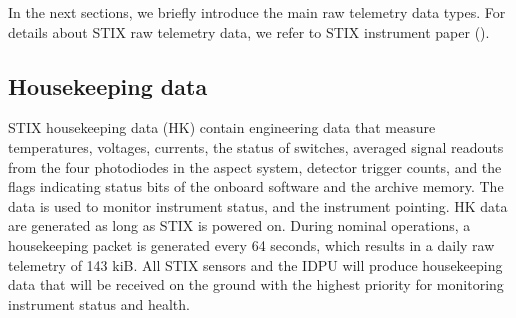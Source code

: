 \documentclass{aa}
\begin{document}
In the next sections, we briefly introduce the main raw telemetry data types.
For details about STIX raw telemetry data, we refer to STIX instrument paper (\cite{StixInstrument}).

\subsection{Housekeeping data}
STIX housekeeping data (HK) contain engineering data that measure temperatures, voltages, currents, the status of switches,
averaged signal readouts from the four photodiodes in the aspect system, detector trigger counts, and the flags indicating
status bits of the onboard software and the archive memory.
The data is used to monitor instrument status, and the instrument pointing.
HK data are generated as long as STIX is powered on.
During nominal operations, a housekeeping packet is generated every 64 seconds, which results in a daily raw telemetry of  143 kiB.
All STIX sensors and the IDPU will produce housekeeping data that will be received on the ground with the highest priority
for monitoring instrument status and health.
\end{document}
